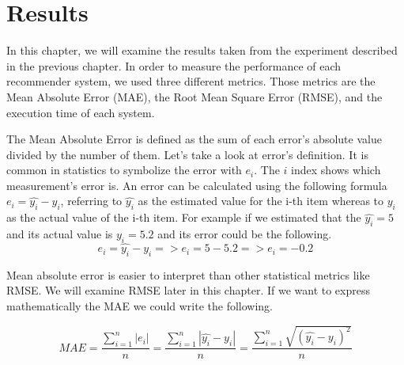 \section{Results}

In this chapter, we will examine the results taken from the experiment described in the previous chapter. 
In order to measure the performance of each recommender system, we used three different metrics. Those metrics are the Mean Absolute Error (MAE), the Root Mean Square Error (RMSE), and the execution time of each system.

The Mean Absolute Error is defined as the sum of each error's absolute value divided by the number of them. Let's take a look
at error's definition. It is common in statistics to symbolize the error with $e_i$. The $i$ index shows which measurement's error is. An error can be calculated using the following formula $e_i = \widehat{y_i} - y_i$, referring to $\widehat{y_{i}}$ as the estimated value for the i-th item whereas to $y_i$ as the actual value of the i-th item. For example if we estimated that the $\widehat{y_i} = 5$ and its actual value is $y_i = 5.2$ and its error could be the following.
\begin{equation}
e_i = \widehat{y_i} - y_i => e_i = 5 - 5.2  => e_i = -0.2
\end{equation}

Mean absolute error is easier to interpret than other statistical metrics like RMSE. We will examine RMSE later in this chapter. If we want to express mathematically the MAE we could write the following.

\begin{equation}
MAE = \frac{\sum_{i=1}^{n}{|e_i|}}{n} =
\frac{\sum_{i=1}^{n}{|\widehat{y_{i}}-y_{i}|} }{n} =
\frac{\sum_{i=1}^{n}\sqrt{{(\widehat{y_{i}}-y_{i})}^{2}}}{n}
\end{equation}

